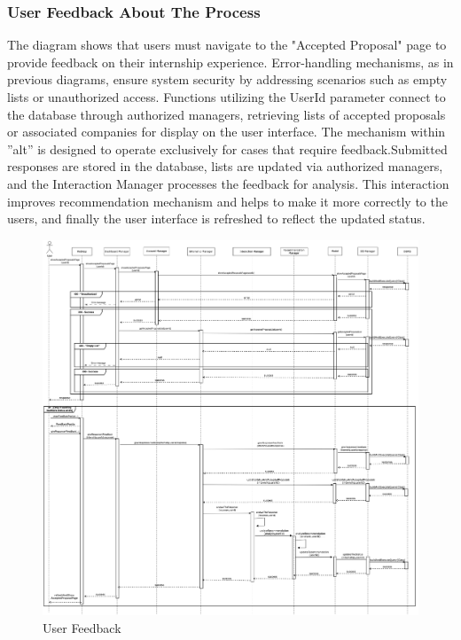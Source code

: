 \documentclass[a4paper,12pt]{article}
\begin{document}
\subsubsection*{ User Feedback About The Process}
The diagram shows that users must navigate to the "Accepted Proposal" page to provide feedback on their internship experience. Error-handling mechanisms, as in previous diagrams, ensure system security by addressing scenarios such as empty lists or unauthorized access. Functions utilizing the UserId parameter connect to the database through authorized managers, retrieving lists of accepted proposals or associated companies for display on the user interface. The mechanism within ''alt'' is designed to operate exclusively for cases that require feedback.Submitted responses are stored in the database, lists are updated via authorized managers, and the Interaction Manager processes the feedback for analysis. This interaction improves recommendation mechanism and helps to make it more correctly to the users, and finally the user interface is refreshed to reflect the updated status.
    \begin{figure}[H]
    \centering
    \includegraphics[scale = 0.25]{DD_figures/RuntimeView/userGivesFeedback.drawio.png}
    \caption{User Feedback}
\end{figure}
\end{document}
